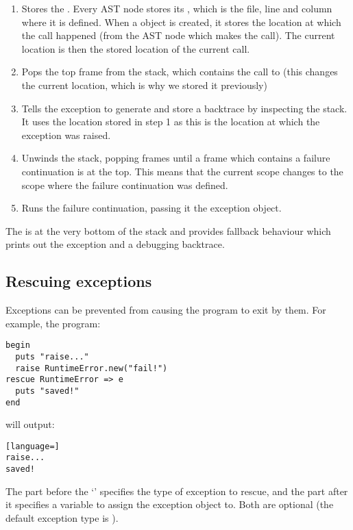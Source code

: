 \begin{enumerate}
  \item Stores the . Every AST node stores its , which is the file, line and column where it is defined. When a  object is created, it stores the location at which the call happened (from the AST node which makes the call). The current location is then the stored location of the current call.
  
  \item Pops the top frame from the stack, which contains the call to  (this changes the current location, which is why we stored it previously)
  
  \item Tells the exception to generate and store a backtrace by inspecting the stack. It uses the location stored in step 1 as this is the location at which the exception was raised.
  
  \item Unwinds the stack, popping frames until a frame which contains a failure continuation is at the top. This means that the current scope changes to the scope where the failure continuation was defined.
  
  \item Runs the failure continuation, passing it the exception object.
\end{enumerate}

The  is at the very bottom of the stack and provides fallback behaviour which prints out the exception and a debugging backtrace.

\subsection{Rescuing exceptions}

Exceptions can be prevented from causing the program to exit by  them. For example, the program:

\begin{lstlisting}
begin
  puts "raise..."
  raise RuntimeError.new("fail!")
rescue RuntimeError => e
  puts "saved!"
end
\end{lstlisting}

will output:

\begin{lstlisting}[language=]
raise...
saved!
\end{lstlisting}

The part before the `\code{=>}' specifies the type of exception to rescue, and the part after it specifies a variable to assign the exception object to. Both are optional (the default exception type is ).

